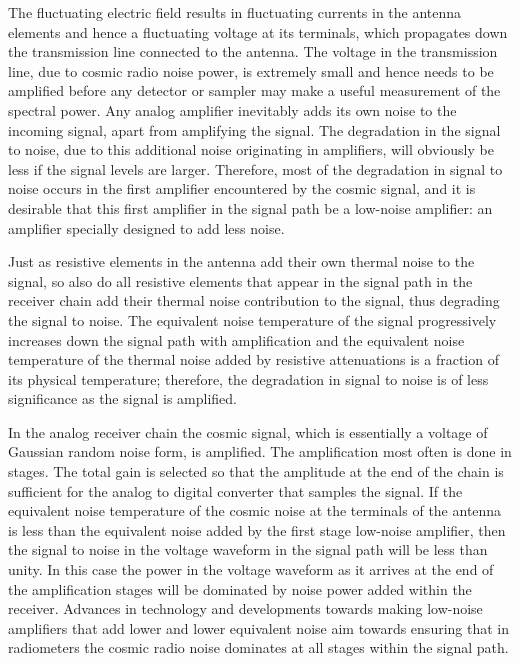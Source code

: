   The fluctuating electric field results in fluctuating currents in the antenna elements and hence a fluctuating voltage at its terminals, which propagates down the transmission line connected to the antenna. The voltage in the transmission line, due to cosmic radio noise power, is extremely small and hence needs to be amplified before any detector or sampler may make a useful measurement of the spectral power.  Any analog amplifier inevitably adds its own noise to the incoming signal, apart from amplifying the signal.  The degradation in the signal to noise, due to this additional noise originating in amplifiers, will obviously be less if the signal levels are larger.  Therefore, most of the degradation in signal to noise occurs in the first amplifier encountered by the cosmic signal, and it is desirable that this first amplifier in the signal path be a low-noise amplifier: an amplifier specially designed to add less noise.  
  
   Just as resistive elements in the antenna add their own thermal noise to the signal, so also do all resistive elements that appear in the signal path in the receiver chain add their thermal noise contribution to the signal, thus degrading the signal to noise.  The equivalent noise temperature of the signal progressively increases down the signal path with amplification and the equivalent noise temperature of the thermal noise added by resistive attenuations is a fraction of its physical temperature; therefore, the degradation in signal to noise is of less significance as the signal is amplified.  
   
   In the analog receiver chain the cosmic signal, which is essentially a voltage of Gaussian random noise form, is amplified.  The amplification most often is done in stages.  The total gain is selected so that the amplitude at the end of the chain is sufficient for the analog to digital converter that samples the signal. If the equivalent noise temperature of the cosmic noise at the terminals of the antenna is less than the equivalent noise added by the first stage low-noise amplifier, then the signal to noise in the voltage waveform in the signal path will be less than unity.  In this case the power in the voltage waveform as it arrives at the end of the amplification stages will be dominated by noise power added within the receiver.  Advances in technology and developments towards making low-noise amplifiers that add lower and lower equivalent noise aim towards ensuring that in radiometers the cosmic radio noise dominates at all stages within the signal path.
   
